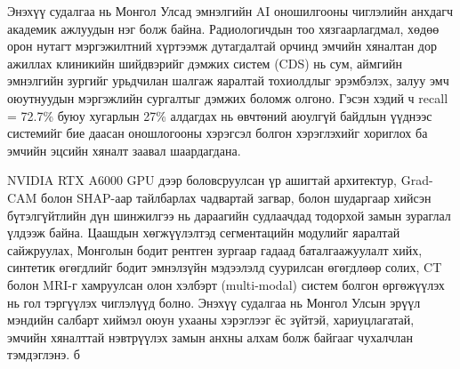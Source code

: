 Энэхүү судалгаа нь Монгол Улсад эмнэлгийн AI оношилгооны чиглэлийн анхдагч академик ажлуудын нэг болж байна. Радиологичдын тоо хязгаарлагдмал, хөдөө орон нутагт мэргэжилтний хүртээмж дутагдалтай орчинд эмчийн хяналтан дор ажиллах клиникийн шийдвэрийг дэмжих систем (CDS) нь сум, аймгийн эмнэлгийн зургийг урьдчилан шалгаж яаралтай тохиолдлыг эрэмбэлэх, залуу эмч оюутнуудын мэргэжлийн сургалтыг дэмжих боломж олгоно. Гэсэн хэдий ч recall = 72.7\% буюу хугарлын 27\% алдагдах нь өвчтөний аюулгүй байдлын үүднээс системийг бие даасан оношлогооны хэрэгсэл болгон хэрэглэхийг хориглох ба эмчийн эцсийн хяналт заавал шаардагдана.

NVIDIA RTX A6000 GPU дээр боловсруулсан үр ашигтай архитектур, Grad-CAM болон SHAP-аар тайлбарлах чадвартай загвар, болон шударгаар хийсэн бүтэлгүйтлийн дүн шинжилгээ нь дараагийн судлаачдад тодорхой замын зураглал үлдээж байна. Цаашдын хөгжүүлэлтэд сегментацийн модулийг яаралтай сайжруулах, Монголын бодит рентген зургаар гадаад баталгаажуулалт хийх, синтетик өгөгдлийг бодит эмнэлзүйн мэдээлэлд суурилсан өгөгдлөөр солих, CT болон MRI-г хамруулсан олон хэлбэрт (multi-modal) систем болгон өргөжүүлэх нь гол тэргүүлэх чиглэлүүд болно. Энэхүү судалгаа нь Монгол Улсын эрүүл мэндийн салбарт хиймэл оюун ухааны хэрэглээг ёс зүйтэй, хариуцлагатай, эмчийн хяналттай нэвтрүүлэх замын анхны алхам болж байгааг чухалчлан тэмдэглэнэ.
б